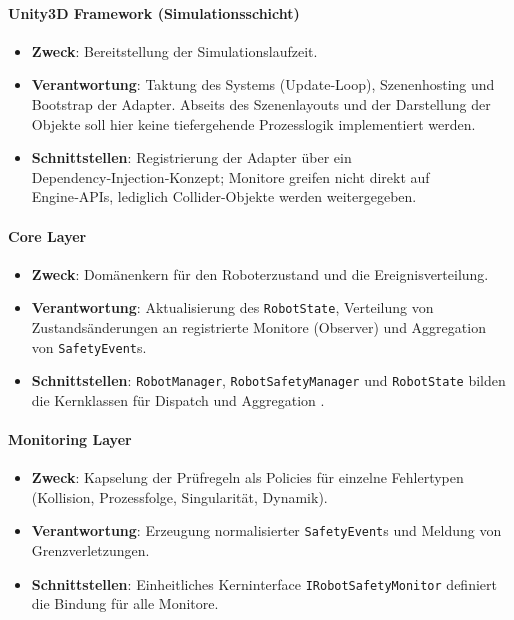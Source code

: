 
\paragraph{Unity3D Framework (Simulationsschicht)}
\begin{itemize}
  \item \textbf{Zweck}: Bereitstellung der Simulationslaufzeit.
  \item \textbf{Verantwortung}: Taktung des Systems (Update‑Loop),
    Szenenhosting und Bootstrap der Adapter. Abseits des
    Szenenlayouts und der Darstellung der Objekte soll hier keine
    tiefergehende Prozesslogik implementiert werden.
  \item \textbf{Schnittstellen}: Registrierung der Adapter über ein
    Dependency‑Injection‑Konzept; Monitore greifen nicht direkt auf
    Engine‑APIs, lediglich Collider-Objekte werden weitergegeben.
\end{itemize}

\paragraph{Core Layer}
\begin{itemize}
  \item \textbf{Zweck}: Domänenkern für den Roboterzustand und die
    Ereignisverteilung.
  \item \textbf{Verantwortung}: Aktualisierung des
    \texttt{RobotState}, Verteilung von Zustandsänderungen an
    registrierte Monitore (Observer) und Aggregation von \texttt{SafetyEvent}s.
  \item \textbf{Schnittstellen}: \texttt{RobotManager},
    \texttt{RobotSafetyManager} und \texttt{RobotState} bilden die
    Kernklassen für Dispatch und Aggregation .
\end{itemize}

\paragraph{Monitoring Layer}
\begin{itemize}
  \item \textbf{Zweck}: Kapselung der Prüfregeln als Policies für
    einzelne Fehlertypen (Kollision, Prozessfolge, Singularität, Dynamik).
  \item \textbf{Verantwortung}: Erzeugung normalisierter
    \texttt{SafetyEvent}s und Meldung von Grenzverletzungen.
  \item \textbf{Schnittstellen}: Einheitliches Kerninterface
    \texttt{IRobotSafetyMonitor} definiert die Bindung für alle Monitore.
\end{itemize}


